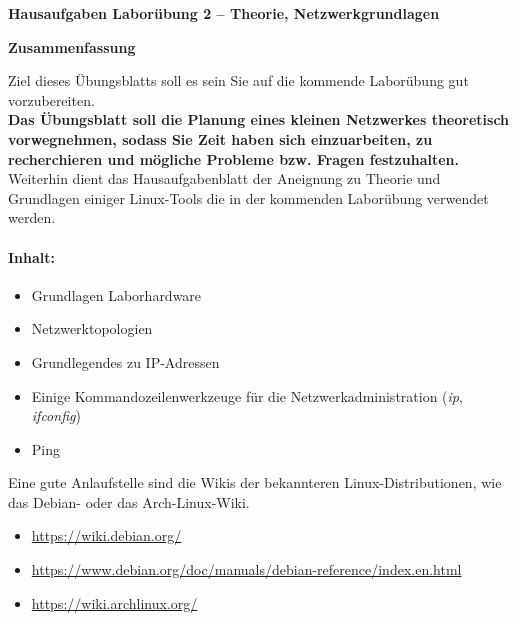 \documentclass[paper=a4,fontsize=11pt]{scrartcl}%
\numberwithin{equation}{section}
\begin{document}
\begin{center}
\Large{\textbf{Hausaufgaben Laborübung 2 -- Theorie, Netzwerkgrundlagen}}
\end{center}
\begin{center}\Large{\textbf{Zusammenfassung}}\end{center}
Ziel dieses Übungsblatts soll es sein Sie auf die kommende Laborübung gut vorzubereiten.\\
\textbf{Das Übungsblatt soll die Planung eines kleinen Netzwerkes theoretisch vorwegnehmen, sodass Sie Zeit haben sich einzuarbeiten, zu recherchieren und mögliche Probleme bzw. Fragen festzuhalten.}\\
Weiterhin dient das Hausaufgabenblatt der Aneignung zu Theorie und Grundlagen einiger Linux-Tools die in der kommenden Laborübung verwendet werden.
\paragraph{Inhalt:}
\begin{itemize}
	\item Grundlagen Laborhardware
	\item Netzwerktopologien
	\item Grundlegendes zu IP-Adressen
	\item Einige Kommandozeilenwerkzeuge für die Netzwerkadministration (\emph{ip}, \emph{ifconfig})
	\item Ping
\end{itemize}
Eine gute Anlaufstelle sind die Wikis der bekannteren Linux-Distributionen, wie das Debian- oder das Arch-Linux-Wiki.
\begin{itemize}
	\item \url{https://wiki.debian.org/}
	\item \url{https://www.debian.org/doc/manuals/debian-reference/index.en.html}
	\item \url{https://wiki.archlinux.org/}
\end{itemize}
\end{document}
